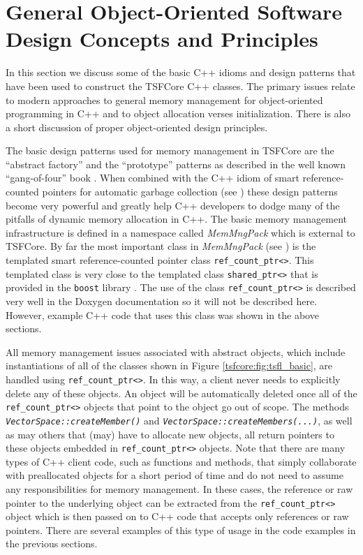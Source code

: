 %
\section{General Object-Oriented Software Design Concepts and Principles}
\label{tsfcore:sec:general_software_concepts}
%
 
In this section we discuss some of the basic C++ idioms and design
patterns that have been used to construct the TSFCore C++ classes.  The
primary issues relate to modern approaches to general memory
management for object-oriented programming in C++ and to object
allocation verses initialization.  There is also a short discussion of
proper object-oriented design principles.

The basic design patterns used for memory management in TSFCore are the
``abstract factory'' and the ``prototype'' patterns as described in
the well known ``gang-of-four'' book \cite{ref:gama_et_al_1995}.  When
combined with the C++ idiom of smart reference-counted pointers for
automatic garbage collection (see \cite[Items 28-29]{ref:meyers_1996})
these design patterns become very powerful and greatly help C++
developers to dodge many of the pitfalls of dynamic memory allocation
in C++.  The basic memory management infrastructure is defined in a
namespace called \textit{MemMngPack} which is external to TSFCore.  By
far the most important class in \textit{MemMngPack} (see
\cite{ref:moochodevguide}) is the templated smart reference-counted pointer class
\texttt{ref\_count\_ptr<>}.  This templated class is very close to the
templated class \texttt{shared\_ptr<>} that is provided in the
\texttt{boost} library \cite{ref:boost}.  The use of the class
\texttt{ref\_count\_ptr<>} is described very well in the Doxygen
documentation so it will not be described here.  However, example C++
code that uses this class was shown in the above sections.

All memory management issues associated with abstract objects, which
include instantiations of all of the classes shown in Figure
\ref{tsfcore:fig:tsfl_basic}, are handled using
\texttt{ref\_count\_ptr<>}.  In this way, a client never needs to
explicitly delete any of these objects.  An object will be
automatically deleted once all of the
\texttt{ref\_count\_ptr<>} objects that point to the object go out of
scope.  The methods
\texttt{\textit{VectorSpace\-::createMember()}} and
\texttt{\textit{VectorSpace\-::createMembers(...)}}, as well as may others that
(may) have to allocate new objects, all return pointers to these
objects embedded in \texttt{ref\_count\_ptr<>} objects.  Note that
there are many types of C++ client code, such as functions and
methods, that simply collaborate with preallocated objects for a short
period of time and do not need to assume any responsibilities for
memory management.  In these cases, the reference or raw pointer to the
underlying object can be extracted from the
\texttt{ref\_count\_ptr<>} object which is then passed on to C++ code
that accepts only references or raw pointers.  There are several
examples of this type of usage in the code examples in the previous
sections.

